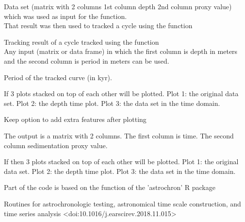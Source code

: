 \documentclass[a4paper]{book}
\begin{document}
%
\begin{Arguments}
\begin{ldescription}
\item[\code{data}] Data set (matrix with 2 columns 1st column depth 2nd column proxy value)
which was used as input for the  function. \\{}
That result was then used to tracked a cycle using the  function

\item[\code{tracked\_cycle\_curve}] Tracking result of a cycle tracked using the
 function \\{}
Any input (matrix or data frame) in which the first column
is depth in meters and the second column is period in meters can be used.

\item[\code{tracked\_cycle\_period}] Period of the tracked curve (in kyr).

\item[\code{genplot}] If  3 plots stacked on top of each other will be plotted.
Plot 1: the original data set.
Plot 2: the depth time plot.
Plot 3: the data set in the time domain.

\item[\code{keep\_editable}] Keep option to add extra features after plotting  
\end{ldescription}
\end{Arguments}
%
\begin{Value}
The output is a matrix with 2 columns.
The first column is time.
The second column sedimentation proxy value.

If  then 3 plots stacked on top of each other will be plotted.
Plot 1: the original data set.
Plot 2: the depth time plot.
Plot 3: the data set in the time domain.
\end{Value}
%
\begin{Author}
Part of the code is based on the 
function of the 'astrochron' R package
\end{Author}
%
\begin{References}
Routines for astrochronologic testing, astronomical time scale construction, and
time series analysis <doi:10.1016/j.earscirev.2018.11.015>
\end{References}
%
\end{document}
